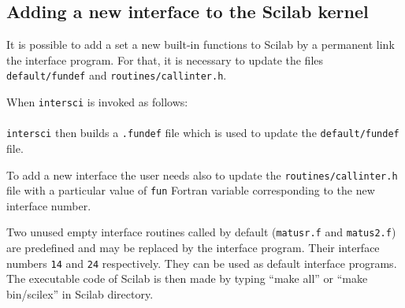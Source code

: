\documentclass[11pt]{article}
\begin{document}
\subsection{Adding a new interface to the Scilab kernel}

It is possible to add a set a new built-in functions to Scilab
by a permanent link the interface program. 
For that, it is necessary to update the files {\tt default/fundef}
and {\tt   routines/callinter.h}.

When {\tt intersci} is invoked as follows:\\

\T{\ }\\

{\tt intersci} then builds a {\tt .fundef} file which is used to
update the {\tt default/fundef} file.

To add a new interface the user needs also
to update the {\tt   routines/callinter.h} file with a particular 
value of {\tt fun} Fortran variable corresponding to the new interface
number.

Two unused empty interface routines called by default ({\tt matusr.f} 
and {\tt matus2.f}) are predefined and may be replaced by 
the interface program. Their interface numbers {\tt 14} and {\tt 24}
respectively. They can be used as default interface programs.
The executable code of Scilab is then made by typing ``make all''
or ``make bin/scilex'' in Scilab directory.


\printindex
\end{document}
